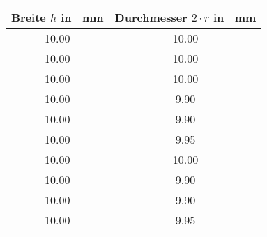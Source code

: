 \begin{center}
\begin{tabular}{c|c}
	Breite $h$ in \SI{}{\milli\metre}& Durchmesser $2 \cdot r$ in \SI{}{\milli\metre}	\\
	\hline
	10.00 & 10.00 \\
	10.00  & 10.00 \\
	10.00  & 10.00 \\
	10.00  & 9.90 \\
	10.00  & 9.90 \\
	10.00  & 9.95 \\
	10.00  & 10.00 \\
	10.00  & 9.90 \\
	10.00  & 9.90 \\
	10.00 & 9.95 \\
\end{tabular}	
\end{center}